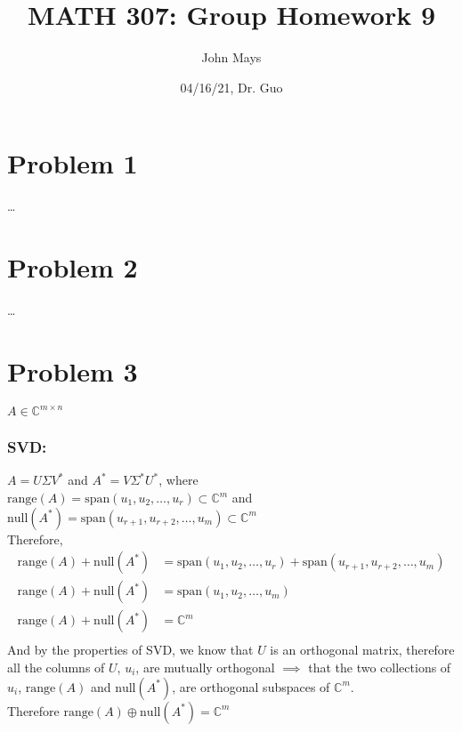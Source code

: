 \documentclass[fleqn]{article}
\title{\textbf{MATH 307: Group Homework 9}}
\author{John Mays}
\date{04/16/21, Dr. Guo}
\begin{document}
\maketitle

\section*{Problem 1}
\dots
\section*{Problem 2}
\dots
\section*{Problem 3}
$A \in \mathbb{C}^{m \times n}$
\subsubsection*{SVD:}
    $A = U \Sigma V^{*}$ and $A^{*} = V \Sigma^{*} U^{*}$, where \\
    $\text{range}(A) = \text{span}(u_1, u_2, \dots, u_r) \subset \mathbb{C}^{m}$ and \\
    $\text{null}(A^{*}) = \text{span}(u_{r+1}, u_{r+2}, \dots, u_{m}) \subset \mathbb{C}^{m}$\\
\linebreak
Therefore,
\begin{equation*}
    \begin{split}
        \text{range}(A) + \text{null}(A^{*}) &= \text{span}(u_1, u_2, \dots, u_r) + \text{span}(u_{r+1}, u_{r+2}, \dots, u_{m})\\ 
        \text{range}(A) + \text{null}(A^{*}) &= \text{span}(u_{1}, u_{2}, \dots, u_{m})\\
        \text{range}(A) + \text{null}(A^{*}) &= \mathbb{C}^{m}\\
    \end{split}
\end{equation*}
And by the properties of SVD, we know that $U$ is an orthogonal matrix, therefore all the columns of $U$, $u_i$, are mutually orthogonal $\implies$ that the two collections of $u_i$, $\text{range}(A)$ and $\text{null}(A^{*})$, are orthogonal subspaces of $\mathbb{C}^{m}$.\\
\linebreak
Therefore $\text{range}(A) \oplus \text{null}(A^{*}) = \mathbb{C}^{m}$
%
\end{document}
